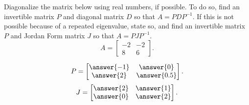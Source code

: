 \documentclass{ximera}
\begin{document}
\begin{exercise}%
    Diagonalize the matrix below using real numbers, if possible. To do so, find an invertible matrix $P$ and diagonal matrix $D$ so that $A = PDP^{-1}$. If this is not possible because of a repeated eigenvalue, state so, and find an invertible matrix $P$ and Jordan Form matrix $J$ so that $A = PJP^{-1}$. 
    \[ 
        A = 
        \begin{bmatrix} 
            -2 & -2 \\ 
            8 & 6 
        \end{bmatrix}.
    \]
    \begin{multipleChoice}
    \end{multipleChoice}
    \begin{problem}
        \[ 
            P = 
            \begin{bmatrix} 
                \answer{-1} & \answer{0} \\  
                \answer{2} & \answer{0.5}
            \end{bmatrix}.
        \]
        \[ 
            J = 
            \begin{bmatrix} 
                \answer{2} & \answer{1} \\  
                \answer{0} & \answer{2}
            \end{bmatrix}.
        \]
    \end{problem}
\end{exercise} 
\end{document}
